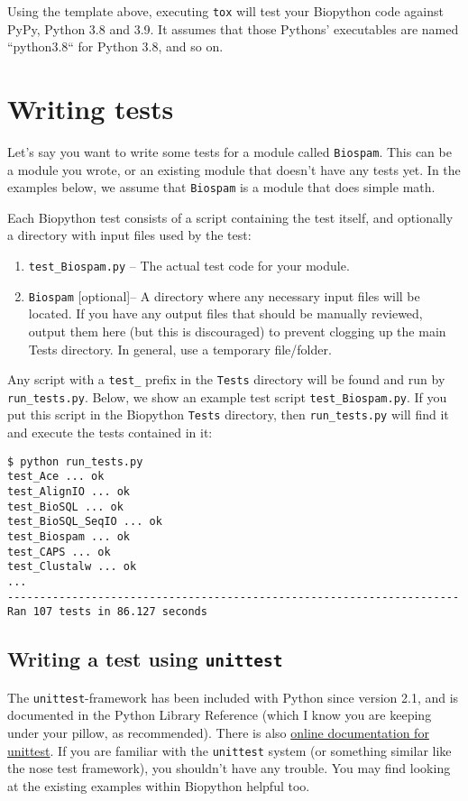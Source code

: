 Using the template above, executing \texttt{tox} will test your Biopython
code against PyPy, Python 3.8 and 3.9. It assumes that those Pythons'
executables are named ``python3.8`` for Python 3.8, and so on.


\section{Writing tests}

Let's say you want to write some tests for a module called \verb|Biospam|.
This can be a module you wrote, or an existing module that doesn't have
any tests yet.  In the examples below, we assume that
\verb|Biospam| is a module that does simple math.

Each Biopython test consists of a script containing the test itself, and
optionally a directory with input files used by the test:

\begin{enumerate}
  \item \verb|test_Biospam.py| -- The actual test code for your module.
  \item \verb|Biospam| [optional]-- A directory where any necessary input files
    will be located. If you have any output files that should be manually
    reviewed, output them here (but this is discouraged) to prevent clogging
    up the main Tests directory. In general, use a temporary file/folder.
\end{enumerate}

Any script with a \verb|test_| prefix in the \verb|Tests| directory will be found and run by \verb|run_tests.py|. Below, we show an example test script \verb|test_Biospam.py|. If you put this script in the Biopython \verb|Tests| directory, then \verb|run_tests.py| will find it and execute the tests contained in it:

\begin{verbatim}
$ python run_tests.py
test_Ace ... ok
test_AlignIO ... ok
test_BioSQL ... ok
test_BioSQL_SeqIO ... ok
test_Biospam ... ok
test_CAPS ... ok
test_Clustalw ... ok
...
----------------------------------------------------------------------
Ran 107 tests in 86.127 seconds
\end{verbatim}

\subsection{Writing a test using \texttt{unittest}}

The \verb|unittest|-framework has been included with Python since version
2.1, and is documented in the Python Library Reference (which I know you
are keeping under your pillow, as recommended).  There is also
\href{https://docs.python.org/3/library/unittest.html}{online documentation
for unittest}.
If you are familiar with the \verb|unittest| system (or something similar
like the nose test framework), you shouldn't have any trouble.  You may
find looking at the existing examples within Biopython helpful too.


